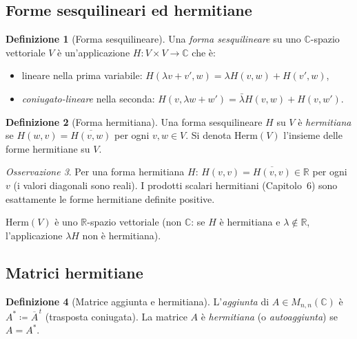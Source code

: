 \documentclass[11pt, a4paper]{book}
\theoremstyle{definition}
\newtheorem{definizione}{Definizione}[section]
\theoremstyle{plain}
\theoremstyle{remark}
\newtheorem{osservazione}[definizione]{Osservazione}
\newcommand{\R}{\mathbb{R}}
\newcommand{\C}{\mathbb{C}}
\begin{document}
\subsection{Forme sesquilineari ed hermitiane}

\begin{defbox}
\begin{definizione}[Forma sesquilineare]
\label{def:sesquilineare}
Una \emph{forma sesquilineare} su uno $\C$-spazio vettoriale $V$ è un'applicazione $H \colon V \times V \to \C$ che è:
\begin{itemize}
  \item lineare nella prima variabile: $H(\lambda v+v',w) = \lambda H(v,w)+H(v',w)$,
  \item \emph{coniugato-lineare} nella seconda: $H(v,\lambda w+w') = \bar{\lambda}H(v,w)+H(v,w')$.
\end{itemize}
\end{definizione}
\end{defbox}

\begin{defbox}
\begin{definizione}[Forma hermitiana]
\label{def:forma-herm}
Una forma sesquilineare $H$ su $V$ è \emph{hermitiana} se $H(w,v) = \overline{H(v,w)}$ per ogni $v,w \in V$. Si denota $\mathrm{Herm}(V)$ l'insieme delle forme hermitiane su $V$.
\end{definizione}
\end{defbox}

\begin{osservazione}
Per una forma hermitiana $H$: $H(v,v) = \overline{H(v,v)} \in \R$ per ogni $v$ (i valori diagonali sono reali). I prodotti scalari hermitiani (Capitolo~6) sono esattamente le forme hermitiane definite positive.
\end{osservazione}

$\mathrm{Herm}(V)$ è uno $\R$-spazio vettoriale (non $\C$: se $H$ è hermitiana e $\lambda \notin \R$, l'applicazione $\lambda H$ non è hermitiana).

\subsection{Matrici hermitiane}

\begin{defbox}
\begin{definizione}[Matrice aggiunta e hermitiana]
L'\emph{aggiunta} di $A \in M_{n,n}(\C)$ è $A^* \coloneqq \overline{A}^{\,t}$ (trasposta coniugata). La matrice $A$ è \emph{hermitiana} (o \emph{autoaggiunta}) se $A = A^*$.
\end{definizione}
\end{defbox}
\end{document}
